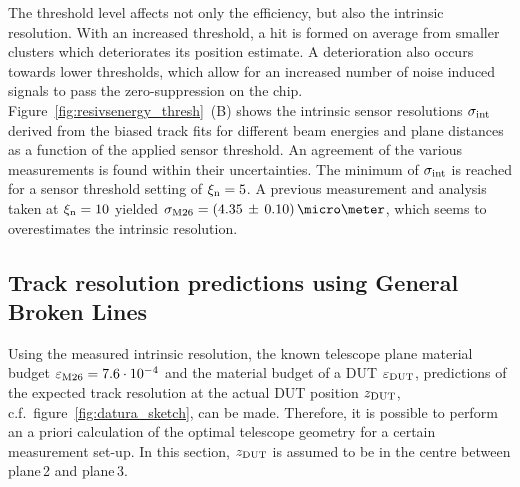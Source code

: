 The threshold level affects not only the efficiency, but also the intrinsic resolution. 
With an increased threshold, a hit is formed on average from smaller clusters which deteriorates its position estimate. 
A deterioration also occurs towards lower thresholds, which allow for an increased number of noise induced signals to pass the zero-suppression on the chip.
Figure~\ref{fig:resivsenergy_thresh}~(B) shows the intrinsic sensor resolutions $\sigma_{\textrm{int}}$ derived from the biased track fits
 for different beam energies and plane distances as a function of the applied sensor threshold.
An agreement of the various measurements is found within their uncertainties. 
The minimum of $\sigma_{\textrm{int}}$ is reached for a sensor threshold setting of $\xi_{\textrm{n}} = 5$.
A previous measurement and analysis~\cite{ref:j.behrmeasurements} taken at $\xi_{\textrm{n}} = 10$ yielded $\sigma_{\textrm{M26}} = (4.35\,\pm\,0.10)\,\micro\meter$,
 which seems to overestimates the intrinsic resolution. 



\subsection{Track resolution predictions using General Broken Lines}

% 
Using the measured intrinsic resolution, the known telescope plane material budget $\mathnormal{\varepsilon_{\textrm{M26}}} = 7.6\cdot 10^{-4}$ and the material budget of a DUT $\mathnormal{\varepsilon_{\textrm{DUT}}}$,
 predictions of the expected track resolution at the actual DUT position $z_{\textrm{DUT}}$, c.f.\ figure~\ref{fig:datura_sketch}, can be made.
Therefore, it is possible to perform an a priori calculation of the optimal telescope geometry for a certain measurement set-up. 
In this section, $z_{\textrm{DUT}}$ is assumed to be in the centre between plane\,2 and plane\,3.

